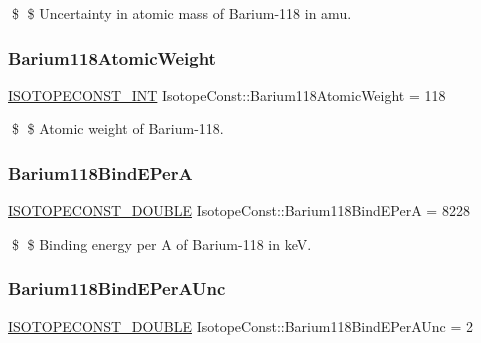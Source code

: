 \$ \$ Uncertainty in atomic mass of Barium-\/118 in amu. \mbox{\label{group___isotope_const-_barium-_ba118_ga9868868b59a341d7022db761ebe0ef52}} 
\subsubsection{\texorpdfstring{Barium118\+Atomic\+Weight}{Barium118AtomicWeight}}
{\footnotesize\ttfamily \mbox{\hyperlink{group___isotope_const-_macros_ga5f18360b3e99483a35c32d789e62621c}{I\+S\+O\+T\+O\+P\+E\+C\+O\+N\+S\+T\+\_\+\+I\+NT}} Isotope\+Const\+::\+Barium118\+Atomic\+Weight = 118}

\$ \$ Atomic weight of Barium-\/118. \mbox{\label{group___isotope_const-_barium-_ba118_ga6bb9950a9636d900f15ac2b873fabd8e}} 
\subsubsection{\texorpdfstring{Barium118\+Bind\+E\+PerA}{Barium118BindEPerA}}
{\footnotesize\ttfamily \mbox{\hyperlink{group___isotope_const-_macros_ga8f45a7272ce02c0b4c65c44636ed719a}{I\+S\+O\+T\+O\+P\+E\+C\+O\+N\+S\+T\+\_\+\+D\+O\+U\+B\+LE}} Isotope\+Const\+::\+Barium118\+Bind\+E\+PerA = 8228}

\$ \$ Binding energy per A of Barium-\/118 in keV. \mbox{\label{group___isotope_const-_barium-_ba118_gaa88a0e47f3e44036ba253fa323f50c00}} 
\subsubsection{\texorpdfstring{Barium118\+Bind\+E\+Per\+A\+Unc}{Barium118BindEPerAUnc}}
{\footnotesize\ttfamily \mbox{\hyperlink{group___isotope_const-_macros_ga8f45a7272ce02c0b4c65c44636ed719a}{I\+S\+O\+T\+O\+P\+E\+C\+O\+N\+S\+T\+\_\+\+D\+O\+U\+B\+LE}} Isotope\+Const\+::\+Barium118\+Bind\+E\+Per\+A\+Unc = 2}

